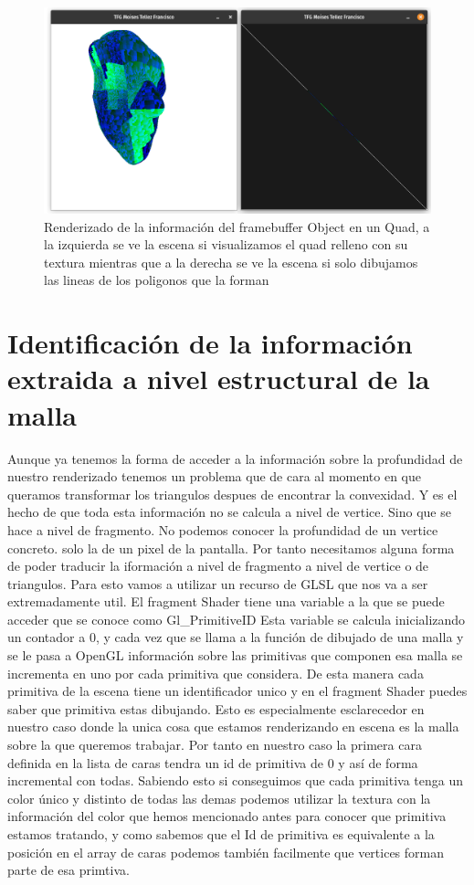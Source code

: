 \begin{figure}
    \centering
    \includegraphics[scale=0.3]{imagenes/fbo.png}
    \caption[Renderizado de la información de un framebuffer Object]{Renderizado de la información del framebuffer Object en un Quad, a la izquierda se ve la escena si visualizamos el quad relleno con su textura mientras que a la derecha se ve la escena si solo dibujamos las lineas de los poligonos que la forman}
\end{figure}

\section{Identificación de la información extraida a nivel estructural de la malla}

Aunque ya tenemos la forma de acceder a la información sobre la profundidad de nuestro renderizado tenemos un problema que de cara al momento en que queramos transformar los triangulos despues de encontrar la convexidad. Y es el hecho de que toda esta información no se calcula a nivel de vertice. Sino que se hace a nivel de fragmento. No podemos conocer la profundidad de un vertice concreto. solo la de un pixel de la pantalla. Por tanto necesitamos alguna forma de poder traducir la iformación a nivel de fragmento a nivel de vertice o de triangulos. Para esto vamos a utilizar un recurso de GLSL que nos va a ser extremadamente util.
El fragment Shader tiene una variable a la que se puede acceder que se conoce como Gl\_PrimitiveID \cite{khronosGlPrimitiveIDOpenGL} Esta variable se calcula inicializando un contador a 0, y cada vez que se llama a la función de dibujado de una malla y se le pasa a OpenGL información sobre las primitivas que componen esa malla se incrementa en uno por cada primitiva que considera. De esta manera cada primitiva de la escena tiene un identificador unico y en el fragment Shader puedes saber que primitiva estas dibujando. Esto es especialmente esclarecedor en nuestro caso donde la unica cosa que estamos renderizando en escena es la malla
sobre la que queremos trabajar. Por tanto en nuestro caso la primera cara definida en la lista de caras tendra un id de primitiva de 0 y así de forma incremental con todas.
Sabiendo esto si conseguimos que cada primitiva tenga un color único y distinto de todas las demas podemos utilizar la textura con la información del color que hemos mencionado antes para conocer que primitiva estamos tratando, y como sabemos que el Id de primitiva es equivalente a la posición en el array de caras podemos también facilmente que vertices forman parte de esa primtiva.


